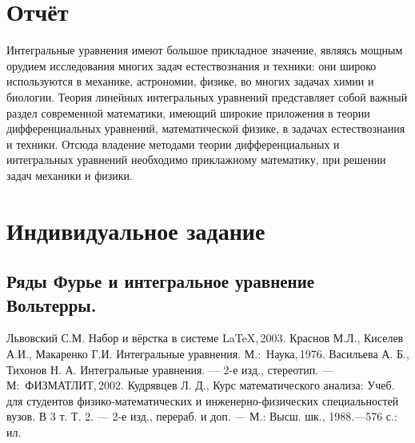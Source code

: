 \documentclass[12pt]{article}
\begin{document}
	\section{Отчёт}
	Интегральные уравнения имеют большое прикладное значение, являясь мощным
	орудием исследования многих задач естествознания и техники: они широко используются
	в механике, астрономии, физике, во многих задачах химии и биологии. Теория линейных
	интегральных уравнений представляет собой важный раздел современной математики,
	имеющий широкие приложения в теории дифференциальных уравнений, математической
	физике, в задачах естествознания и техники. Отсюда владение методами теории
	дифференциальных и интегральных уравнений необходимо приклажному математику, при решении задач
	механики и физики.
	
	\newpage
	\section{Индивидуальное задание}
	\subsection{Ряды Фурье и интегральное уравнение Вольтерры.}
	
	
	
	\newpage
	\begin{thebibliography}{99}
		 Львовский С.М. Набор и вёрстка в системе \LaTeX,\,2003.
		 Краснов М.Л., Киселев А.И., Макаренко Г.И. Интегральные уравнения. М.:~Наука,\,1976.
		 Васильева А. Б., Тихонов Н. А. Интегральные уравнения. --- 2-е изд., стереотип. --- М:~ФИЗМАТЛИТ,\,2002.
		 Кудрявцев Л. Д., Курс математического анализа: Учеб. для студентов физико-математических и инженерно-физических специальностей вузов. В 3 т. Т. 2. --- 2-е изд., перераб. и доп. --- М.: Высш. шк., 1988.---576 с.: ил.
	\end{thebibliography}
	
\end{document}
